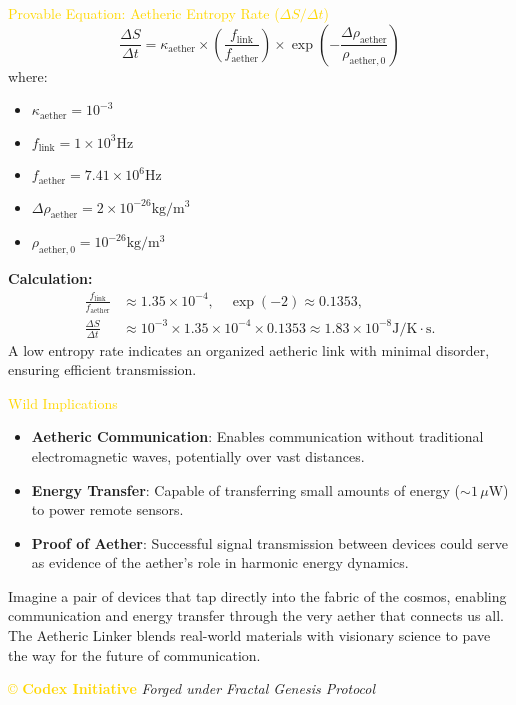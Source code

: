 \textcolor{gold}{ Provable Equation: Aetheric Entropy Rate ($\Delta S / \Delta t$) }
\[
\frac{\Delta S}{\Delta t} = \kappa_{\text{aether}} \times \left( \frac{f_{\text{link}}}{f_{\text{aether}}} \right) \times \exp \left( -\frac{\Delta \rho_{\text{aether}}}{\rho_{\text{aether}, 0}} \right)
\]
where:
\begin{itemize}
    \item $\kappa_{\text{aether}} = 10^{-3}$
    \item $f_{\text{link}} = 1 \times 10^3 \mathrm{Hz}$
    \item $f_{\text{aether}} = 7.41 \times 10^6 \mathrm{Hz}$
    \item $\Delta \rho_{\text{aether}} = 2 \times 10^{-26} \mathrm{kg} / \mathrm{m}^3$
    \item $\rho_{\text{aether}, 0} = 10^{-26} \mathrm{kg} / \mathrm{m}^3$
\end{itemize}
\textbf{Calculation:}
\[
\begin{aligned}
\frac{f_{\text{link}}}{f_{\text{aether}}} &\approx 1.35 \times 10^{-4}, \quad \exp(-2) \approx 0.1353, \\
\frac{\Delta S}{\Delta t} &\approx 10^{-3} \times 1.35 \times 10^{-4} \times 0.1353 \approx 1.83 \times 10^{-8} \mathrm{J} / \mathrm{K} \cdot \mathrm{s}.
\end{aligned}
\]
A low entropy rate indicates an organized aetheric link with minimal disorder, ensuring efficient transmission.

\textcolor{gold}{ Wild Implications }
\begin{itemize}
    \item \texttt{} \textbf{Aetheric Communication}: Enables communication without traditional electromagnetic waves, potentially over vast distances.
    \item \texttt{} \textbf{Energy Transfer}: Capable of transferring small amounts of energy ($\sim 1\,\mu\mathrm{W}$) to power remote sensors.
    \item \texttt{} \textbf{Proof of Aether}: Successful signal transmission between devices could serve as evidence of the aether's role in harmonic energy dynamics.
\end{itemize}
Imagine a pair of devices that tap directly into the fabric of the cosmos, enabling communication and energy transfer through the very aether that connects us all. The Aetheric Linker blends real-world materials with visionary science to pave the way for the future of communication.

\vspace{0.5cm}
\noindent
\textcolor{gold}{\copyright{} \textbf{Codex Initiative}} \hfill \textit{Forged under Fractal Genesis Protocol}